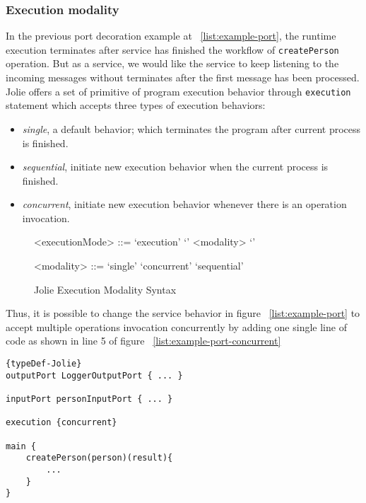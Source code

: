 \subsubsection{Execution modality}

In the previous port decoration example at ~\ref{list:example-port}, the runtime execution terminates after service has finished the workflow of \texttt{createPerson} operation. But as a service, we would like the service to keep listening to the incoming messages without terminates after the first message has been processed.
Jolie offers a set of primitive of program execution behavior through \texttt{execution} statement which accepts three types of execution behaviors:

\begin{itemize}
    \item \textit{single}, a default behavior; which terminates the program after current process is finished.
    \item \textit{sequential}, initiate new execution behavior when the current process is finished.
    \item \textit{concurrent}, initiate new execution behavior whenever there is an operation invocation.
\end{itemize}

\begin{figure}[ht]
    \begin{framed}
        \begin{grammar}
            <executionMode>
            ::= `execution' `{' <modality> `}'

            <modality>
            ::= `single'
            \alt `concurrent'
            \alt `sequential'
        \end{grammar}
    \end{framed}
    \caption{Jolie Execution Modality Syntax}
\end{figure}

Thus, it is possible to change the service behavior in figure ~\ref{list:example-port} to accept multiple operations invocation concurrently by adding one single line of code as shown in line 5 of figure ~\ref{list:example-port-concurrent}

\begin{listing}[ht]

    \lstset{language=Jolie,
        style=codeStyle,
        numbers=left,
        firstnumber=1
    }
    \begin{lstlisting}[frame=tlrb, caption= {Jolie concurrent service example}, label={list:example-port-concurrent} ]{typeDef-Jolie}
outputPort LoggerOutputPort { ... }

inputPort personInputPort { ... }

execution {concurrent}

main {
    createPerson(person)(result){
        ...
    }
}
\end{lstlisting}
\end{listing}

\FloatBarrier